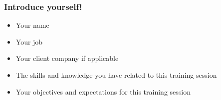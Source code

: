 \begin{frame}
  \frametitle{Introduce yourself!}
  \begin{itemize}
    \item Your name
    \item Your job
    \item Your client company if applicable
    \item The skills and knowledge you have related to this training session
    \item Your objectives and expectations for this training session
  \end{itemize}
\end{frame}
